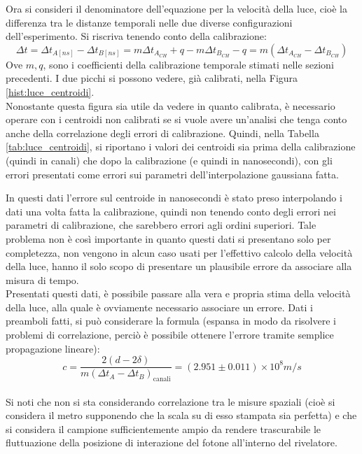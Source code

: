 Ora si consideri il denominatore dell'equazione per la velocità della luce, cioè la differenza tra le distanze temporali nelle due diverse configurazioni dell'esperimento.
Si riscriva tenendo conto della calibrazione:
$$
  \Delta t = \Delta t_{A[ns]} - \Delta t_{B[ns]} = m\Delta t_{A_{CH}} + q - m\Delta t_{B_{CH}} - q = m (\Delta t_{A_{CH}} - \Delta t_{B_{CH}}) 
$$
Ove $m,q$, sono i coefficienti della calibrazione temporale stimati nelle sezioni precedenti. I due picchi si possono vedere, già calibrati, nella Figura \ref{hist:luce_centroidi}.\\

Nonostante questa figura sia utile da vedere in quanto calibrata, è necessario operare con i centroidi non calibrati se si vuole avere un'analisi che tenga conto anche
della correlazione degli errori di calibrazione. Quindi, nella Tabella \ref{tab:luce_centroidi}, si riportano i valori dei centroidi sia prima della calibrazione (quindi in canali)
che dopo la calibrazione (e quindi in nanosecondi), con gli errori presentati come errori sui parametri dell'interpolazione gaussiana fatta.


In questi dati l'errore sul centroide in nanosecondi è stato preso interpolando i dati una volta fatta la calibrazione, quindi non tenendo conto degli errori nei parametri
di calibrazione, che sarebbero errori agli ordini superiori. Tale problema non è così importante in quanto questi dati si presentano solo per completezza, non vengono in
alcun caso usati per l'effettivo calcolo della velocità della luce, hanno il solo scopo di presentare un plausibile errore da associare alla misura di tempo.\\

Presentati questi dati, è possibile passare alla vera e propria stima della velocità della luce, alla quale è ovviamente necessario associare un errore. Dati i preamboli
fatti, si può considerare la formula (espansa in modo da risolvere i problemi di correlazione, perciò è possibile ottenere l'errore tramite semplice propagazione
lineare):
$$
  c = \frac{2 ( d - 2 \delta)}{m (\Delta t_A - \Delta t_B)_\text{canali}} = (2.951 \pm 0.011) \times 10^8 m/s 
$$
\\

Si noti che non si sta considerando correlazione tra le misure spaziali (cioè si considera il metro supponendo che la scala su di esso stampata sia perfetta) e che si considera il campione sufficientemente ampio da rendere trascurabile le fluttuazione della posizione di interazione del fotone all'interno del rivelatore.

